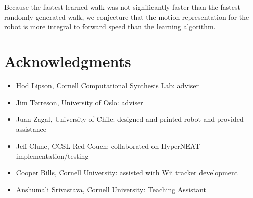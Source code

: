 
Because the fastest learned walk was not
significantly faster than the fastest randomly generated walk, we
conjecture that the motion representation for the robot is more
integral to forward speed than the learning algorithm.



\section{Acknowledgments}
\begin{itemize}
\item Hod Lipson, Cornell Computational Synthesis Lab: adviser
\item Jim T\o rreson, University of Oslo: adviser
\item Juan Zagal, University of Chile: designed and printed robot and provided assistance
\item Jeff Clune, CCSL Red Couch: collaborated on HyperNEAT implementation/testing
\item Cooper Bills, Cornell University: assisted with Wii tracker development
\item Anshumali Srivastava, Cornell University: Teaching Assistant
\end{itemize}

